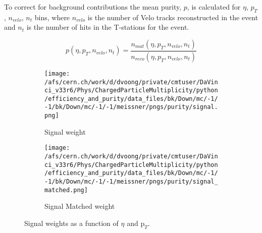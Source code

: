 To correct for background contributions the mean purity, $p$, is calculated for $\eta$, $p_T$, $n_{velo}$, $n_{t}$ bins, where $n_{velo}$ is the number of Velo tracks reconstructed in the event and $n_t$ is the number of hits in the T-stations for the event.

\begin{equation}
	p(\eta, p_T, n_{velo}, n_t) = \frac{n_{mat}(\eta, p_T, n_{velo}, n_t)}{n_{reco}(\eta, p_T, n_{velo}, n_t)}
\end{equation}

\begin{figure}
	\begin{subfigure}[h]{0.49\textwidth}
		\texttt{[image: /afs/cern.ch/work/d/dvoong/private/cmtuser/DaVinci\_v33r6/Phys/ChargedParticleMultiplicity/python/efficiency\_and\_purity/data\_files/bk/Down/mc/-1/-1/bk/Down/mc/-1/-1/meissner/pngs/purity/signal.png]}
		\caption{Signal weight}
		\label{fig: signal weight}
	\end{subfigure}
	\begin{subfigure}[h]{0.49\textwidth}
		\texttt{[image: /afs/cern.ch/work/d/dvoong/private/cmtuser/DaVinci\_v33r6/Phys/ChargedParticleMultiplicity/python/efficiency\_and\_purity/data\_files/bk/Down/mc/-1/-1/bk/Down/mc/-1/-1/meissner/pngs/purity/signal\_matched.png]}
		\caption{Signal Matched weight}
		\label{fig: signal matched weight}
	\end{subfigure}
	\caption{Signal weights as a function of $\eta$ and $\mathrm{p}_T$.}
	\label{fig: signal weights}
\end{figure}

